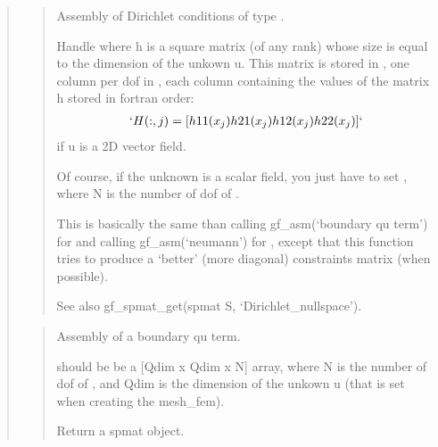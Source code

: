 \documentclass[a4paper,11pt,english]{sphinxmanual}
\begin{document}
\begin{quote}
\sphinxAtStartPar
{}
\begin{quote}

\sphinxAtStartPar
Assembly of Dirichlet conditions of type .

\sphinxAtStartPar
Handle  where h is a square matrix (of any rank) whose
size is equal to the dimension of the unkown u. This matrix is
stored in , one column per dof in , each column containing
the values of the matrix h stored in fortran order:
\begin{equation*}
\begin{split}`H(:,j) = [h11(x_j) h21(x_j) h12(x_j) h22(x_j)]`\end{split}
\end{equation*}
\sphinxAtStartPar
if u is a 2D vector field.

\sphinxAtStartPar
Of course, if the unknown is a scalar field, you just have to set
, where N is the number of dof of .

\sphinxAtStartPar
This is basically the same than calling gf\_asm(‘boundary qu term’)
for  and calling gf\_asm(‘neumann’) for , except that this
function tries to produce a ‘better’ (more diagonal) constraints
matrix (when possible).

\sphinxAtStartPar
See also gf\_spmat\_get(spmat S, ‘Dirichlet\_nullspace’).
\end{quote}

\sphinxAtStartPar
{}
\begin{quote}

\sphinxAtStartPar
Assembly of a boundary qu term.

\sphinxAtStartPar
{} should be be a {[}Qdim x Qdim x N{]} array, where N is the number
of dof of , and Qdim is the dimension of the unkown u (that
is set when creating the mesh\_fem).

\sphinxAtStartPar
Return a spmat object.
\end{quote}

\sphinxAtStartPar
{}
\begin{quote}


\end{quote}
\end{quote}
\end{document}
